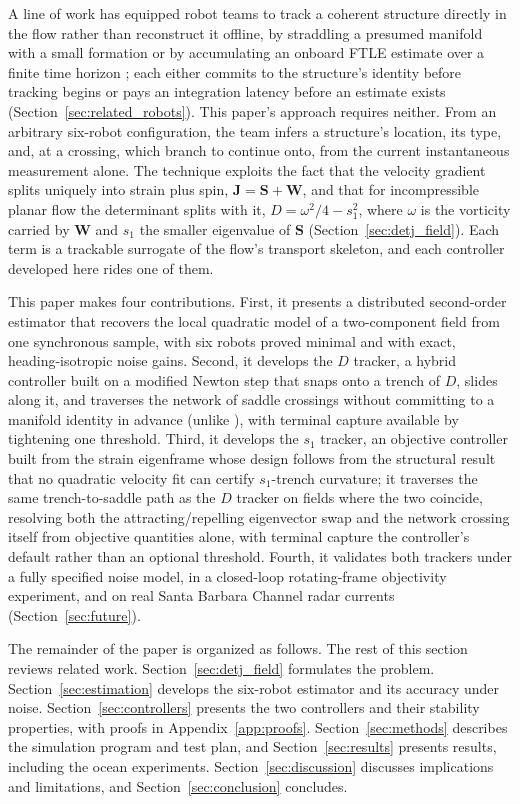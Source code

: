 \documentclass[lettersize,journal]{IEEEtran}
\begin{document}
A line of work has equipped robot teams to track a coherent structure
directly in the flow rather than reconstruct it offline, by straddling
a presumed manifold with a small formation \cite{9,10,11,12} or by
accumulating an onboard FTLE estimate over a finite time horizon
\cite{13}; each either commits to the structure's identity before
tracking begins or pays an integration latency before an estimate
exists (Section~\ref{sec:related_robots}). This paper's approach
requires neither. From an arbitrary six-robot configuration, the team
infers a structure's location, its type, and, at a crossing, which
branch to continue onto, from the current instantaneous measurement
alone. The technique exploits the fact that the velocity gradient
splits uniquely into strain plus spin, $\mathbf{J} = \mathbf{S} +
\mathbf{W}$, and that for incompressible planar flow the determinant
splits with it, $D = \omega^2/4 - s_1^2$, where $\omega$ is the
vorticity carried by $\mathbf{W}$ and $s_1$ the smaller eigenvalue of
$\mathbf{S}$ (Section~\ref{sec:detj_field}). Each term is a trackable
surrogate of the flow's transport skeleton, and each controller
developed here rides one of them.

This paper makes four contributions. First, it presents a distributed
second-order estimator that recovers the local quadratic model of a
two-component field from one synchronous sample, with six robots proved
minimal and with exact, heading-isotropic noise gains. Second, it
develops the $D$ tracker, a hybrid controller built on a modified
Newton step that snaps onto a trench of $D$, slides along it, and
traverses the network of saddle crossings without committing to a
manifold identity in advance (unlike \cite{9,10}), with terminal
capture available by tightening one threshold. Third, it develops the
$s_1$ tracker, an objective controller built from the strain
eigenframe whose design follows from the structural result that no
quadratic velocity fit can certify $s_1$-trench curvature; it traverses
the same trench-to-saddle path as the $D$ tracker on fields where the
two coincide, resolving both the attracting/repelling eigenvector swap
and the network crossing itself from objective quantities alone, with
terminal capture the controller's default rather than an optional
threshold. Fourth, it validates both trackers under a fully specified
noise model, in a closed-loop rotating-frame objectivity experiment,
and on real Santa Barbara Channel radar currents
(Section~\ref{sec:future}).

The remainder of the paper is organized as follows. The rest of this
section reviews related work. Section~\ref{sec:detj_field} formulates
the problem. Section~\ref{sec:estimation} develops the six-robot
estimator and its accuracy under noise. Section~\ref{sec:controllers}
presents the two controllers and their stability properties, with
proofs in Appendix~\ref{app:proofs}. Section~\ref{sec:methods}
describes the simulation program and test plan, and
Section~\ref{sec:results} presents results, including the ocean
experiments. Section~\ref{sec:discussion} discusses implications and
limitations, and Section~\ref{sec:conclusion} concludes.
\end{document}
